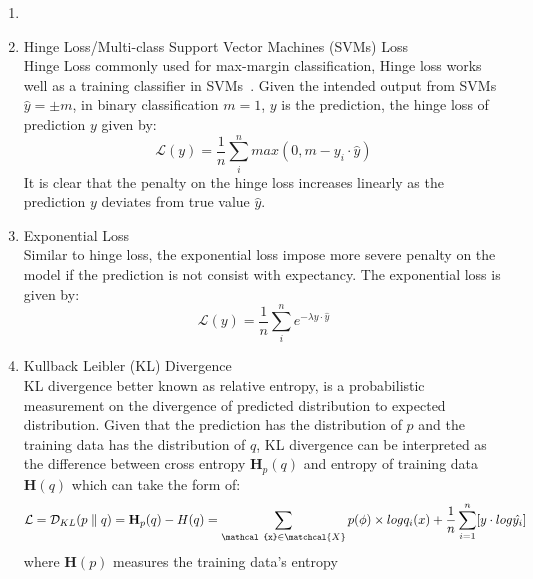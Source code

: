 \begin{enumerate}
    \item 
    \item Hinge Loss/Multi-class Support Vector Machines (SVMs) Loss \\
Hinge Loss commonly used for max-margin classification, Hinge loss works well as a training classifier in SVMs~\cite{Cortes_1995}. Given the intended output from SVMs $\hat{y} = \pm m$, in binary classification $m = 1$, $y$ is the prediction, the hinge loss of prediction $y$ given by:
\begin {equation}
    \mathcal{L}(y) = \frac {1}{n} \sum_i^n max(0,m - y_i \cdot \hat{y})
\end{equation}
It is clear that the penalty on the hinge loss increases linearly as the prediction $y$ deviates from true value $\hat{y}$.
    \item Exponential Loss \\
Similar to hinge loss, the exponential loss impose more severe penalty on the model if the prediction is not consist with expectancy. The exponential loss is given by:
\begin {equation}
    \mathcal{L}(y) = \frac {1}{n} \sum_i^n e^{-\lambda y \cdot \hat{y}}
\end{equation}
    \item Kullback Leibler (KL) Divergence\\
KL divergence better known as relative entropy, is a probabilistic measurement on the divergence of predicted distribution to expected distribution. Given that the prediction has the distribution of $p$ and the training data has the distribution of $q$, KL divergence can be interpreted as the difference between cross entropy $\mathbf{H}_p(q)$ and entropy of training data $\mathbf{H}(q)$ which can take the form of:
\begin{equation}
    \mathcal{L} = \mathcal{D}_{KL}(p \parallel q) = \mathbf{H}_p(q) - H(q) 
    = \sum_{\mathcal{x} \in \matchcal{X}} p(\phi) \times log q_i(x)  + \frac{1}{n}\sum_{i=1}^n [y \cdot log\hat{y_i}]
\end{equation}
where $\mathbf{H}(p)$ measures the training data's entropy
\end {enumerate}

